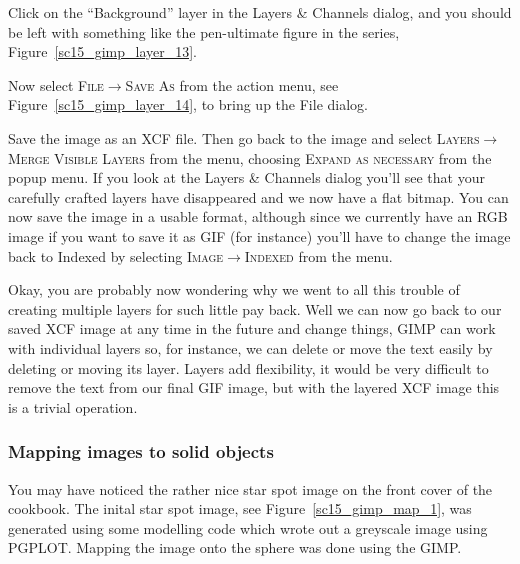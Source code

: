 \documentclass[twoside,11pt]{starlink}
\begin{document}
Click on the ``Background'' layer in the Layers \& Channels dialog,
and you should be left with something like the pen-ultimate figure in
the series, Figure~\ref{sc15_gimp_layer_13}.



Now select \textsc{File}$\rightarrow$\textsc{Save As} from the action menu,
see Figure~\ref{sc15_gimp_layer_14}, to bring up the File dialog.

Save the image as an XCF file. Then go back to the image and select
\textsc{Layers}$\rightarrow$\textsc{Merge Visible Layers} from the menu,
choosing \textsc{Expand as necessary} from the popup menu. If you look at
the Layers \& Channels dialog you'll see that your carefully crafted
layers have disappeared and we now have a flat bitmap. You can now
save the image in a usable format, although since we currently have an
RGB image if you want to save it as GIF (for instance) you'll have to
change the image back to Indexed by selecting \textsc{Image}$\rightarrow$\textsc{Indexed} from the menu.

Okay, you are probably now wondering why we went to all this trouble
of creating multiple layers for such little pay back. Well we can now
go back to our saved XCF image at any time in the future and change
things, GIMP can work with individual layers so, for instance, we can
delete or move the text easily by deleting or moving its layer. Layers
add flexibility, it would be very difficult to remove the text from
our final GIF image, but with the layered XCF image this is a trivial
operation.

\subsubsection{Mapping images to solid objects}

You may have noticed the rather nice star spot image on the front
cover of the cookbook. The inital star spot image, see
Figure~\ref{sc15_gimp_map_1}, was generated using some modelling code
which wrote out a greyscale image using PGPLOT. Mapping the image onto
the sphere was done using the GIMP.

\end{document}
